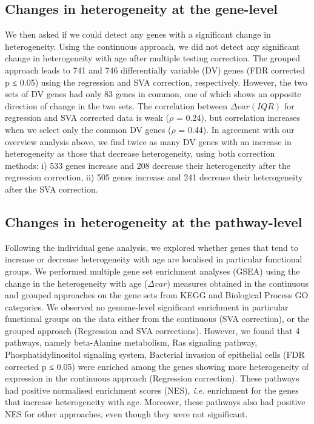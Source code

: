 \documentclass[12pt,twoside]{unicam}
\begin{document}
\hypertarget{changes-in-heterogeneity-at-the-gene-level}{%
\subsection{Changes in heterogeneity at the gene-level}\label{changes-in-heterogeneity-at-the-gene-level}}

We then asked if we could detect any genes with a significant change in heterogeneity. Using the continuous approach, we did not detect any significant change in heterogeneity with age after multiple testing correction. The grouped approach leads to 741 and 746 differentially variable (DV) genes (FDR corrected p ≤ 0.05) using the regression and SVA correction, respectively. However, the two sets of DV genes had only 83 genes in common, one of which shows an opposite direction of change in the two sets. The correlation between \(\Delta var(IQR)\) for regression and SVA corrected data is weak (\(\rho\) = 0.24), but correlation increases when we select only the common DV genes (\(\rho\) = 0.44). In agreement with our overview analysis above, we find twice as many DV genes with an increase in heterogeneity as those that decrease heterogeneity, using both correction methods: i) 533 genes increase and 208 decrease their heterogeneity after the regression correction, ii) 505 genes increase and 241 decrease their heterogeneity after the SVA correction.

\hypertarget{changes-in-heterogeneity-at-the-pathway-level}{%
\subsection{Changes in heterogeneity at the pathway-level}\label{changes-in-heterogeneity-at-the-pathway-level}}

Following the individual gene analysis, we explored whether genes that tend to increase or decrease heterogeneity with age are localised in particular functional groups. We performed multiple gene set enrichment analyses (GSEA) using the change in the heterogeneity with age (\(\Delta var\)) measures obtained in the continuous and grouped approaches on the gene sets from KEGG and Biological Process GO categories. We observed no genome-level significant enrichment in particular functional groups on the data either from the continuous (SVA correction), or the grouped approach (Regression and SVA corrections). However, we found that 4 pathways, namely beta-Alanine metabolism, Ras signaling pathway, Phosphatidylinositol signaling system, Bacterial invasion of epithelial cells (FDR corrected p ≤ 0.05) were enriched among the genes showing more heterogeneity of expression in the continuous approach (Regression correction). These pathways had positive normalised enrichment scores (NES), \emph{i.e.} enrichment for the genes that increase heterogeneity with age. Moreover, these pathways also had positive NES for other approaches, even though they were not significant.
\end{document}
